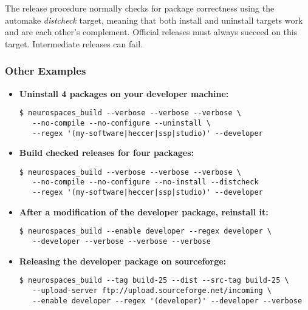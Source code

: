 \documentclass[12pt]{article}
\begin{document}
The release procedure normally checks for package correctness using the automake {\it distcheck} target, meaning that both install and uninstall targets work and are each other's complement. Official releases must always succeed on this target. Intermediate releases can fail.


\subsubsection*{Other Examples}

\begin{itemize}
\item {\bf Uninstall 4 packages on your developer machine:}
\begin{verbatim}
$ neurospaces_build --verbose --verbose --verbose \
   --no-compile --no-configure --uninstall \
   --regex '(my-software|heccer|ssp|studio)' --developer
\end{verbatim}

\item {\bf Build checked releases for four packages:}
\begin{verbatim}
$ neurospaces_build --verbose --verbose --verbose \
   --no-compile --no-configure --no-install --distcheck 
   --regex '(my-software|heccer|ssp|studio)' --developer
\end{verbatim}

\item {\bf After a modification of the developer package, reinstall it:}
\begin{verbatim}
$ neurospaces_build --enable developer --regex developer \
   --developer --verbose --verbose --verbose
\end{verbatim}

\item {\bf Releasing the developer package on sourceforge:}
\begin{verbatim}
$ neurospaces_build --tag build-25 --dist --src-tag build-25 \
   --upload-server ftp://upload.sourceforge.net/incoming \
   --enable developer --regex '(developer)' --developer --verbose
\end{verbatim}
\end{itemize}
\end{document}
